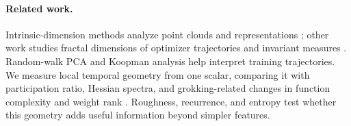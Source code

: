 {\paragraph{Related work.}
Intrinsic-dimension methods analyze point clouds and representations \citep{facco2017estimating,ansuini2019intrinsic,pope2021intrinsic}; other work studies fractal dimensions of optimizer trajectories and invariant measures \citep{simsekli2020hausdorff,camuto2021fractal,birdal2021intrinsic,tan2024limitations}. Random-walk PCA \citep{antognini2018pca} and Koopman analysis \citep{redman2024equivalent} help interpret training trajectories. We measure local temporal geometry from one scalar, comparing it with participation ratio, Hessian spectra, and grokking-related changes in function complexity and weight rank \citep{gao2017theory,cohen2021gradient,liu2022omnigrok,yunis2024rank,humayun2024deep}. Roughness, recurrence, and entropy test whether this geometry adds useful information beyond simpler features.
}
